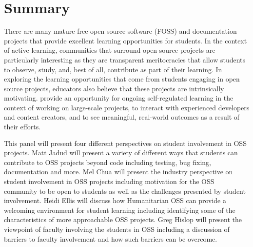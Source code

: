 \documentclass{sig-alternate}
\begin{document}
                
\maketitle



\section{Summary}
There are many mature free open source software (FOSS) and documentation projects that provide excellent learning opportunities for students.  In the context of active learning, communities that surround open source projects are particularly interesting as they are transparent meritocracies that allow students to observe, study, and, best of all, contribute as part of their learning.  In exploring the learning opportunities that come from students engaging in open source projects, educators also believe that these projects are intrinsically motivating.%
provide an opportunity for ongoing self-regulated learning in the context of working on large-scale projects\cite{1089794}, to interact with experienced developers and content creators, and to see meaningful, real-world outcomes as a result of their efforts.

This panel will present four different perspectives on student involvement in OSS projects. Matt Jadud will present a variety of different ways that students can contribute to OSS projects beyond code including  testing, bug fixing, documentation and more. Mel Chua will present the industry perspective on student involvement in OSS projects including motivation for the OSS community to be open to students as well as the challenges presented by student involvement. Heidi Ellis will discuss how Humanitarian OSS can provide a welcoming environment for student learning including identifying some of the characteristics of more approachable OSS projects. Greg Hislop will present the viewpoint of faculty involving the students in OSS including a discussion of barriers to faculty involvement and how such barriers can be overcome. 
\end{document}

